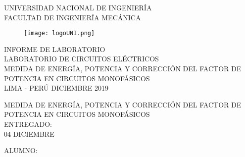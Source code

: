 \documentclass[a4paper,12pt]{report}
\begin{document}
\setcounter{page}{1}
\thispagestyle{empty}
\begin{center}
{\huge UNIVERSIDAD NACIONAL DE INGENIERÍA}\\[0.9cm]
{\Large FACULTAD DE INGENIERÍA MECÁNICA}\\[0.6in]
\end{center}
\begin{figure}[h]
\begin{center}
\texttt{[image: logoUNI.png]}
\vspace{0cm}
\end{center}
\end{figure}
\vspace{0.5cm}
\begin{center}
INFORME DE LABORATORIO\\
LABORATORIO DE CIRCUITOS ELÉCTRICOS\\[5mm]
{\large MEDIDA DE ENERGÍA, POTENCIA Y CORRECCIÓN DEL FACTOR DE POTENCIA EN CIRCUITOS MONOFÁSICOS}\\[10mm]
\vfill
LIMA - PERÚ \hfill DICIEMBRE 2019
\end{center}
\newpage
\thispagestyle{empty}
\begin{center}
{\Huge MEDIDA DE ENERGÍA, POTENCIA Y CORRECCIÓN DEL FACTOR DE POTENCIA EN CIRCUITOS MONOFÁSICOS}\\[0.7cm]
\small ENTREGADO:\\[0.05cm]
\small 04 DICIEMBRE\\[1.2cm]
\end{center}
\begin{flushleft}
{\large ALUMNO:}\\[2cm]
\end{flushleft}
\end{document}
